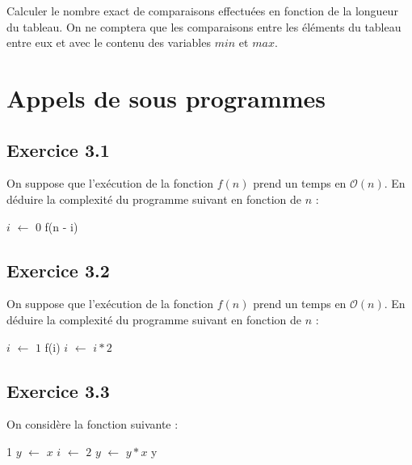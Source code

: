 \documentclass{article}[12pt]
\newcommand*\Let[2]{\State #1 $\gets$ #2}
\begin{document}
Calculer le nombre exact de comparaisons effectuées en fonction de la longueur du tableau. On ne comptera que les comparaisons entre les éléments du tableau entre eux et avec le contenu des variables $min$ et $max$.

\section{Appels de sous programmes}

\subsection*{Exercice 3.1}
On suppose que l'exécution de la fonction $f(n)$ prend un temps en $\mathcal{O}(n)$. En déduire la complexité du programme suivant en fonction de $n$ :
\begin{tcolorbox}
  \begin{algorithmic}[1]
    \Statex
      \Let{$i$}{$0$}
        \State f(n - i)
      \EndFor
  \end{algorithmic}
\end{tcolorbox}

\subsection*{Exercice 3.2}
On suppose que l'exécution de la fonction $f(n)$ prend un temps en $\mathcal{O}(n)$. En déduire la complexité du programme suivant en fonction de $n$ :
\begin{tcolorbox}
  \begin{algorithmic}[1]
    \Statex
      \Let{$i$}{$1$}
      \State f(i)
        \Let{$i$}{$i * 2$}
      \EndFor
  \end{algorithmic}
\end{tcolorbox}  

  \subsection*{Exercice 3.3}
  
  On considère la fonction suivante :
  
\begin{tcolorbox}  
   \begin{algorithmic}[1]
         1
    \EndIf
    \Let{$y$}{$x$}
    \Let{$i$}{$2$}
        \Let{$y$}{$y * x$}
    \EndFor
    \State {} y
  \EndFunction
  \end{algorithmic}
  \end{tcolorbox}
  
\end{document}
